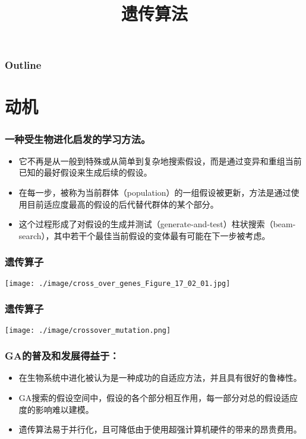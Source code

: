 \documentclass{beamer}
\title{遗传算法}
\author{}
\date{}
\begin{document}
\maketitle

\begin{frame}
\frametitle{Outline}
\setcounter{tocdepth}{3}
\tableofcontents
\end{frame}












\section{动机}
\label{sec-1}
\begin{frame}
\frametitle{一种受生物进化启发的学习方法。}
\label{sec-1-1}

\begin{itemize}
\item <2-> 它不再是从一般到特殊或从简单到复杂地搜索假设，而是通过变异和重组当前已知的最好假设来生成后续的假设。
\item <3-> 在每一步，被称为当前群体（population）的一组假设被更新，方法是通过使用目前适应度最高的假设的后代替代群体的某个部分。
\item <4-> 这个过程形成了对假设的生成并测试（generate-and-test）柱状搜索（beam-search），其中若干个最佳当前假设的变体最有可能在下一步被考虑。
\end{itemize}
\end{frame}
\begin{frame}
\frametitle{遗传算子}
\label{sec-1-2}


\center
\texttt{[image: ./image/cross\_over\_genes\_Figure\_17\_02\_01.jpg]}
\end{frame}
\begin{frame}
\frametitle{遗传算子}
\label{sec-1-3}


\center
\texttt{[image: ./image/crossover\_mutation.png]}
\end{frame}
\begin{frame}
\frametitle{GA的普及和发展得益于：}
\label{sec-1-4}

\begin{itemize}
\item <2-> 在生物系统中进化被认为是一种成功的自适应方法，并且具有很好的鲁棒性。
\item <3-> GA搜索的假设空间中，假设的各个部分相互作用，每一部分对总的假设适应度的影响难以建模。
\item <4-> 遗传算法易于并行化，且可降低由于使用超强计算机硬件的带来的昂贵费用。
\end{itemize}
\end{frame}
\end{document}
